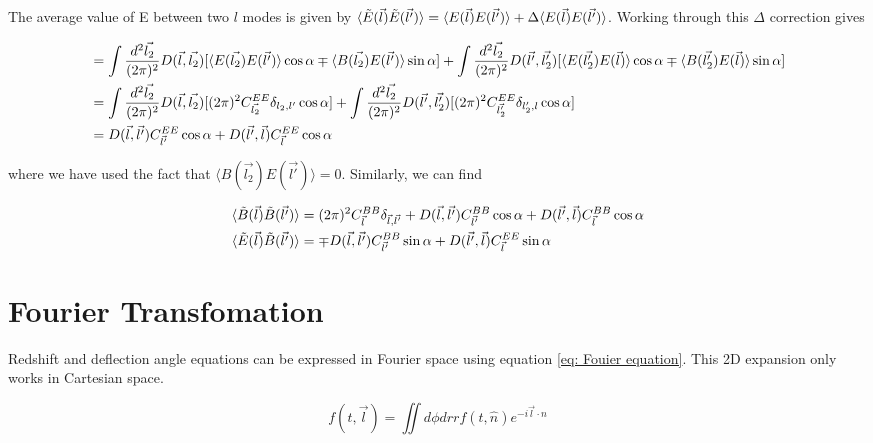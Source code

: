 \documentclass{article}
\begin{document}
The average value of E between two $l$ modes is given by $\langle \Tilde{E}(\vec{l}) \Tilde{E}(\vec{l'})\rangle = \langle {E}(\vec{l}) {E}(\vec{l'})\rangle + \Delta\langle {E}(\vec{l}) {E}(\vec{l'})\rangle$. Working through this $\Delta$ correction gives 

\begin{align}
    &=\int\frac{d^2\vec{l_2}}{(2\pi)^2}D(\vec{l}, \vec{l_2})[\langle {E}(\vec{l_2}) {E}(\vec{l'})\rangle\cos\alpha \mp \langle {B}(\vec{l_2}) {E}(\vec{l'})\rangle\sin\alpha] + \int\frac{d^2\vec{l_2}}{(2\pi)^2}D(\vec{l'}, \vec{l_2'})[\langle {E}(\vec{l_2'}) {E}(\vec{l})\rangle\cos\alpha \mp \langle {B}(\vec{l_2'}) {E}(\vec{l})\rangle\sin\alpha] \notag \\
    &= \int\frac{d^2\vec{l_2}}{(2\pi)^2}D(\vec{l}, \vec{l_2})[(2\pi)^2C_{\vec{l_2}}^{EE}\delta_{l_2,l'}\cos\alpha] + \int\frac{d^2\vec{l_2}}{(2\pi)^2}D(\vec{l'}, \vec{l_2'})[(2\pi)^2C_{\vec{l_2'}}^{EE}\delta_{l_2',l}\cos\alpha] \notag \\
    &= D(\vec{l}, \vec{l'})C_{\vec{l'}}^{EE}\cos\alpha + D(\vec{l'}, \vec{l})C_{\vec{l}}^{EE}\cos\alpha \notag \\
\end{align}

where we have used the fact that $\langle {B}(\vec{l_2}) {E}(\vec{l'})\rangle = 0$. Similarly, we can find 

\begin{align}
    \langle \Tilde{B}(\vec{l}) \Tilde{B}(\vec{l'})\rangle &= (2\pi)^2 C^{BB}_{\vec{l}} \delta_{\vec{l}, \vec{l'}} + D(\vec{l}, \vec{l'})C_{\vec{l'}}^{BB}\cos\alpha + D(\vec{l'}, \vec{l})C_{\vec{l}}^{BB}\cos\alpha \notag \\
    \langle \Tilde{E}(\vec{l}) \Tilde{B}(\vec{l'})\rangle &= \mp D(\vec{l}, \vec{l'})C_{\vec{l'}}^{BB}\sin\alpha + D(\vec{l'}, \vec{l})C_{\vec{l}}^{EE}\sin\alpha \notag \\
\end{align}

\section{Fourier Transfomation}
Redshift and deflection angle equations can be expressed in Fourier space using equation \ref{eq: Fouier equation}. This 2D expansion only works in Cartesian space. 

\begin{equation}
    f(t, \vec{l}) = \iint d\phi dr r f(t, \hat{n}) e^{-i\vec{l}\cdot\hat{n}}
    \label{eq: Fouier equation}
\end{equation}
\end{document}
